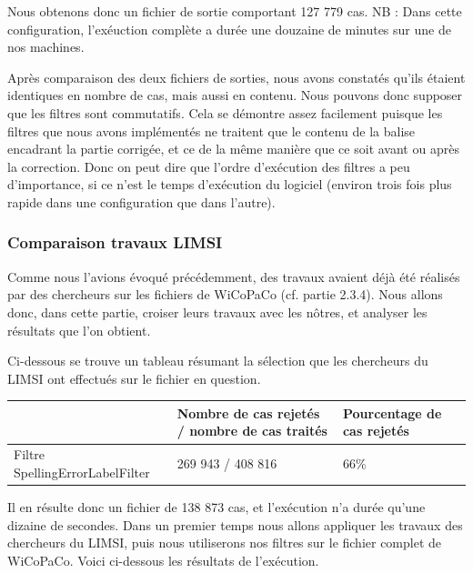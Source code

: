 \documentclass[11pt]{article}
\begin{document}
Nous obtenons donc un fichier de sortie comportant 127 779 cas.
\newline
NB : Dans cette configuration, l'ex\'{e}uction compl\`{e}te a dur\'{e}e une douzaine de minutes sur une de nos machines.
\newline
\newline

Apr\`{e}s comparaison des deux fichiers de sorties, nous avons constat\'{e}s qu'ils \'{e}taient identiques en nombre de cas, mais aussi en contenu. Nous pouvons donc supposer que les filtres sont commutatifs.
Cela se d\'{e}montre assez facilement puisque les filtres que nous avons impl\'{e}ment\'{e}s ne traitent que le contenu de la balise encadrant la partie corrig\'{e}e, et ce de la m\^{e}me mani\`{e}re que ce soit avant ou apr\`{e}s la correction. Donc on peut dire que l'ordre d'ex\'{e}cution des filtres a peu d'importance, si ce n'est le temps d'ex\'{e}cution du logiciel (environ trois fois plus rapide dans une configuration que dans l'autre).


\subsubsection{Comparaison travaux LIMSI}
Comme nous l'avions \'{e}voqu\'{e} pr\'{e}c\'{e}demment, des travaux avaient d\'{e}j\`{a} \'{e}t\'{e} r\'{e}alis\'{e}s par des chercheurs sur les fichiers de WiCoPaCo (cf. partie 2.3.4). Nous allons donc, dans cette partie, croiser leurs travaux avec les n\^{o}tres, et analyser les r\'{e}sultats que l'on obtient.

Ci-dessous se trouve un tableau r\'{e}sumant la s\'{e}lection que les chercheurs du LIMSI ont effectu\'{e}s sur le fichier en question.
\begin{center}
\begin{tabular}{|M{4cm}|M{5cm}|M{6cm}|}
   \hline
    \, &Nombre de cas rejet\'{e}s / nombre de cas trait\'{e}s & Pourcentage de cas rejet\'{e}s \tabularnewline
   \hline
    Filtre SpellingErrorLabelFilter & 269 943 / 408 816 & 66\% \tabularnewline
   \hline
\end{tabular}
\end{center}
Il en r\'{e}sulte donc un fichier de 138 873 cas, et l'ex\'{e}cution n'a dur\'{e}e qu'une dizaine de secondes.
\newline
\newline
Dans un premier temps nous allons appliquer les travaux des chercheurs du LIMSI, puis nous utiliserons nos filtres sur le fichier complet de WiCoPaCo.
Voici ci-dessous les r\'{e}sultats de l'ex\'{e}cution.
\end{document}

